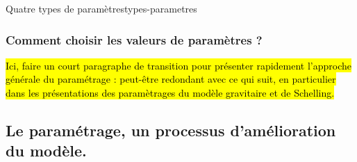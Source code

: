 \begin{encadre}{Quatre types de paramètres}{types-parametres}
\begin{description}
%		
%		
	\end{description}
\end{encadre}


\subsubsection{Comment choisir les valeurs de paramètres ?}

\hl{Ici, faire un court paragraphe de transition pour présenter rapidement l'approche générale du paramétrage : peut-être redondant avec ce qui suit, en particulier dans les présentations des paramètrages du modèle gravitaire et de Schelling.}

\subsection{Le paramétrage, un processus d'amélioration du modèle.}

